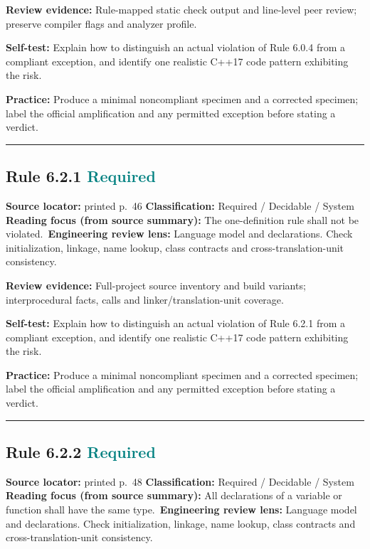 \documentclass[10pt,letterpaper]{article}
\begin{document}
\textbf{Review evidence:} Rule-mapped static check output and line-level peer review; preserve compiler flags and analyzer profile.

\textbf{Self-test:} Explain how to distinguish an actual violation of Rule 6.0.4 from a compliant exception, and identify one realistic C++17 code pattern exhibiting the risk.\par
\textbf{Practice:} Produce a minimal noncompliant specimen and a corrected specimen; label the official amplification and any permitted exception before stating a verdict.
\smallskip\hrule\smallskip
\subsection*{Rule 6.2.1 \enspace \texorpdfstring{\small\textcolor{teal}{Required}}{Required}}
\noindent\textbf{Source locator:} printed p.~46 \quad\textbf{Classification:} Required / Decidable / System\\
\textbf{Reading focus (from source summary):} The one-definition rule shall not be violated.\
\textbf{Engineering review lens:} Language model and declarations. Check initialization, linkage, name lookup, class contracts and cross-translation-unit consistency.

\textbf{Review evidence:} Full-project source inventory and build variants; interprocedural facts, calls and linker/translation-unit coverage.

\textbf{Self-test:} Explain how to distinguish an actual violation of Rule 6.2.1 from a compliant exception, and identify one realistic C++17 code pattern exhibiting the risk.\par
\textbf{Practice:} Produce a minimal noncompliant specimen and a corrected specimen; label the official amplification and any permitted exception before stating a verdict.
\smallskip\hrule\smallskip
\subsection*{Rule 6.2.2 \enspace \texorpdfstring{\small\textcolor{teal}{Required}}{Required}}
\noindent\textbf{Source locator:} printed p.~48 \quad\textbf{Classification:} Required / Decidable / System\\
\textbf{Reading focus (from source summary):} All declarations of a variable or function shall have the same type.\
\textbf{Engineering review lens:} Language model and declarations. Check initialization, linkage, name lookup, class contracts and cross-translation-unit consistency.
\end{document}
